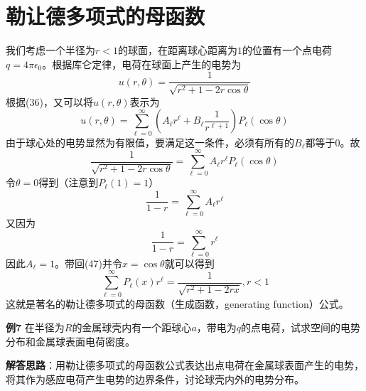 \documentclass[a4paper,10pt]{ctexart}
\begin{document}
\section{勒让德多项式的母函数}
我们考虑一个半径为$r<1$的球面，在距离球心距离为$1$的位置有一个点电荷$q=4\pi \epsilon_0$。根据库仑定律，电荷在球面上产生的电势为
\begin{equation}
u(r,\theta) = \frac{1}{\sqrt{r^2 +1 -2r\cos \theta}}
\end{equation}
根据(36)，又可以将$u(r,\theta)$表示为
\begin{equation}
u(r,\theta) = \sum_{\ell=0}^\infty (A_\ell r^\ell + B_\ell \frac{1}{r^{\ell +1}})P_\ell(\cos \theta)
\end{equation}
由于球心处的电势显然为有限值，要满足这一条件，必须有所有的$B_\ell$都等于0。故
\begin{equation}
\frac{1}{\sqrt{r^2 +1 -2r\cos \theta}} = \sum_{\ell=0}^\infty A_\ell r^\ell P_\ell(\cos \theta)
\end{equation}
令$\theta=0$得到（注意到$P_\ell (1) =1$）
\begin{equation}
\frac{1}{1-r} =\sum_{\ell=0}^\infty A_\ell r^\ell
\end{equation}
又因为
\begin{equation}
\frac{1}{1-r} = \sum_{\ell=0}^\infty r^\ell
\end{equation}
因此$A_\ell=1$。带回(47)并令$x=\cos \theta$就可以得到
\begin{equation}
\sum_{\ell=0}^\infty  P_\ell(x) r^\ell  = \frac{1}{\sqrt{r^2 +1 -2rx}}, r<1
\end{equation}
这就是著名的勒让德多项式的母函数（生成函数，generating function）公式。\par
\textbf{例7} 在半径为$R$的金属球壳内有一个距球心$a$，带电为$q$的点电荷，试求空间的电势分布和金属球表面电荷密度。\par
\textbf{解答思路}：用勒让德多项式的母函数公式表达出点电荷在金属球表面产生的电势，将其作为感应电荷产生电势的边界条件，讨论球壳内外的电势分布。
\end{document}
